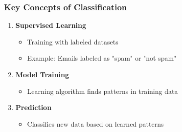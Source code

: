\documentclass[aspectratio=169]{beamer}
\begin{document}
\begin{frame}[fragile]
    \frametitle{Key Concepts of Classification}
    \begin{enumerate}
        \item \textbf{Supervised Learning}
            \begin{itemize}
                \item Training with labeled datasets
                \item Example: Emails labeled as "spam" or "not spam"
            \end{itemize}
        
        \item \textbf{Model Training}
            \begin{itemize}
                \item Learning algorithm finds patterns in training data
            \end{itemize}
        
        \item \textbf{Prediction}
            \begin{itemize}
                \item Classifies new data based on learned patterns
            \end{itemize}
    \end{enumerate}
\end{frame}
\end{document}
